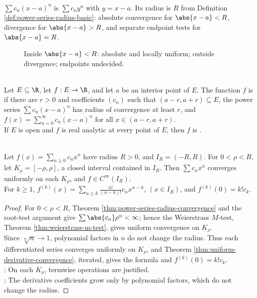 \begin{perspective} \label{per:centered-power-series-translation} \\
$\sum c_n(x-a)^n$ is $\sum c_ny^n$ with $y=x-a$. Its radius is $R$ from Definition \ref{def:power-series-radius-basic}: absolute convergence for $\abs{x-a}<R$, divergence for $\abs{x-a}>R$, and separate endpoint tests for $\abs{x-a}=R$.
\end{perspective}

\begin{figure}[H]
  \centering
  
\caption{Inside $\abs{x-a}<R$: absolute and locally uniform; outside divergence; endpoints undecided.}
  \label{fig:power-series-radius-interval}
\end{figure}

\begin{definition} \label{def:real-analytic-at-point} \\
Let $E\subseteq\R$, let $f:E\to\R$, and let $a$ be an interior point of $E$. The function $f$ is  if there are $r>0$ and coefficients $(c_n)$ such that $(a-r,a+r)\subseteq E$, the power series $\sum c_n(x-a)^n$ has radius of convergence at least $r$, and $f(x)=\sum\limits_{n=0}^{\infty}c_n(x-a)^n$ for all $x\in(a-r,a+r)$.\\
If $E$ is open and $f$ is real analytic at every point of $E$, then $f$ is .
\end{definition}

\begin{theorem} \label{thm:power-series-uniform-differentiation} \\
Let $f(x)=\sum_{n\ge0}c_nx^n$ have radius $R>0$, and $I_R=(-R,R)$. For $0<\rho<R$, let $K_\rho=[-\rho,\rho]$, a closed interval contained in $I_R$. Then $\sum c_nx^n$ converges uniformly on each $K_\rho$, and $f\in C^\infty(I_R)$.\\
For $k\ge1$, $f^{(k)}(x)=\sum\limits_{n\ge k}\frac{n!}{(n-k)!}c_nx^{n-k}$, $(x\in I_R)$, and $f^{(k)}(0)=k!c_k$.
\begin{proof}
For $0<\rho<R$, Theorem \ref{thm:power-series-radius-convergence} and the root-test argument give $\sum\abs{c_n}\rho^n<\infty$; hence the Weierstrass $M$-test, Theorem \ref{thm:weierstrass-m-test}, gives uniform convergence on $K_\rho$.\\
Since $\sqrt[n]{n}\to1$, polynomial factors in $n$ do not change the radius. Thus each differentiated series converges uniformly on $K_\rho$, and Theorem \ref{thm:uniform-derivative-convergence}, iterated, gives the formula and $f^{(k)}(0)=k!c_k$.\\
: On each $K_\rho$, termwise operations are justified.\\
: The derivative coefficients grow only by polynomial factors, which do not change the radius.
\end{proof}
\end{theorem}

